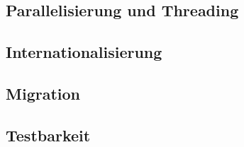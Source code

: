 \subsection{Parallelisierung und Threading}

\subsection{Internationalisierung}

\subsection{Migration}
%

\subsection{Testbarkeit}

